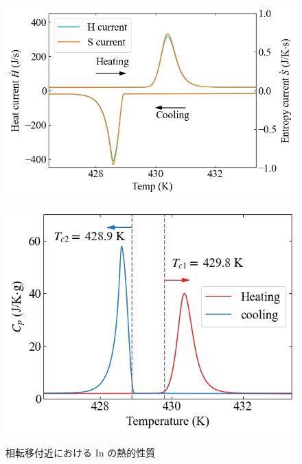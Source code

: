 \documentclass[9pt,dvipdfmx,a4paper]{jsarticle}
\begin{document}
\begin{figure}[hbt]
    \centering
    \begin{minipage}[t]{0.52\columnwidth}
        \centering
        \includegraphics[width = \columnwidth]{result/In-current.png}
        \label{graph:In-current}
    \end{minipage}
    \hfill
    \begin{minipage}[t]{0.44\columnwidth}
        \centering
        \includegraphics[width = \columnwidth]{result/In-Cp.png}
        \label{graph:In-Cp}
    \end{minipage}
    \caption{相転移付近における In の熱的性質}
    \label{graph:In}
\end{figure}
\end{document}
